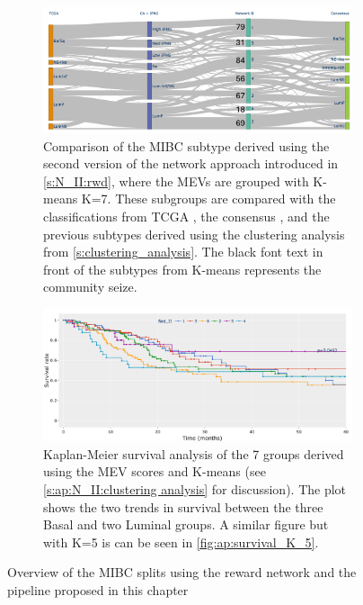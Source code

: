 \begin{figure}[!htb]
    \centering
    \begin{subfigure}[!t]{1.0\textwidth}
        \includegraphics[width=1.0\textwidth,height=1.0\textheight,keepaspectratio]{Sections/Network_II/resources/reward/cluster_comp_final.png}
        \caption{Comparison of the MIBC subtype derived using the second version of the network approach introduced in \cref{s:N_II:rwd}, where the MEVs are grouped with K-means K=7. These subgroups are compared with the classifications from TCGA \citep{Robertson2017-mg}, the consensus \citep{Kamoun2020-tj}, and the previous subtypes derived using the clustering analysis from \cref{s:clustering_analysis}. The black font text in front of the subtypes from K-means represents the community seize.}
        \label{fig:N_II:mibc_comp}
    \end{subfigure}
    \begin{subfigure}[!t]{1.0\textwidth}
        \includegraphics[width=1.0\textwidth,height=1.0\textheight,keepaspectratio]{Sections/Network_II/resources/reward/cluster_analysis/survival_K_7.png}
        \caption[Overview of the MIBC subgroups derived from the non-tumour reward network]{Kaplan-Meier survival analysis of the 7 groups derived using the MEV scores and K-means (see \ref{s:ap:N_II:clustering analysis} for discussion). The plot shows the two trends in survival between the three Basal and two Luminal groups. A similar figure but with K=5 is can be seen in \cref{fig:ap:survival_K_5}. }
        \label{fig:N_II:survival_K_7}
    \end{subfigure} 
    \caption[Refined rewad network: MIBC overview]{Overview of the MIBC splits using the reward network and the pipeline proposed in this chapter}
\end{figure}


